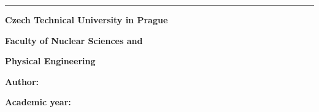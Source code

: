 {\begin{titlepage}
\begin{minipage}[b][\textheight]{0.15\textwidth}
    \end{minipage}
    \hspace{0.05\textwidth}
    \doccol \rule{2pt}{\textheight}
    \hspace{0.05\textwidth}
    \begin{minipage}[b][\textheight]{0.7\textwidth}
      \begin{minipage}[b]{\textwidth}
        \centering \doccol \Large
        \textbf{Czech Technical University in Prague} \par
        \textbf{Faculty of Nuclear Sciences and} \par
        \textbf{Physical Engineering}
      \end{minipage} \par
      \vfill
      \begin{minipage}[b]{\textwidth}
        \centering  \doccol \Huge \textbf{\@title}
      \end{minipage} \par
      \vspace{1cm}
      \begin{minipage}[b]{\textwidth}
        \centering \doccol \Large \textit{\@subtitle}
      \end{minipage} \par
      \vfill
      \begin{minipage}[b]{0.3\textwidth}
        \doccol
        \textbf{Author:} \par
        \textbf{Academic year:}
      \end{minipage}
      \hspace{0.05\textwidth}
      \begin{minipage}[b]{0.65\textwidth}
        \doccol
        \@author \par
        \@academicyear
      \end{minipage}
    \end{minipage}
  \end{titlepage}
  \cleardoublepage

}
